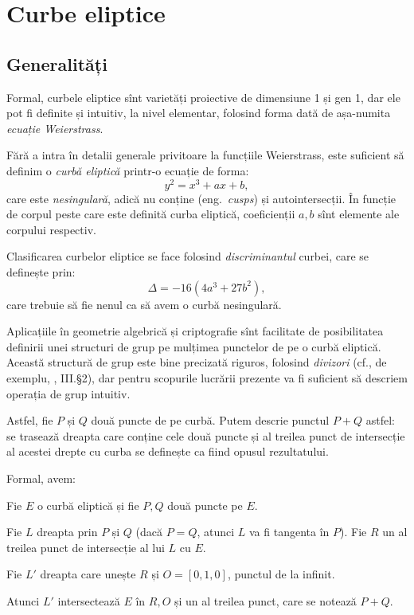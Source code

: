 
\chapter{Curbe eliptice}
\label{ch:curbe}

\section{Generalități}

Formal, curbele eliptice sînt varietăți proiective de dimensiune 1 și gen 1,
dar ele pot fi definite și intuitiv, la nivel elementar, folosind forma
dată de așa-numita \emph{ecuație Weierstrass}.

Fără a intra în detalii generale privitoare la funcțiile Weierstrass, este
suficient să definim o \emph{curbă eliptică} printr-o ecuație de forma:
\[
  y^2 = x^3 + ax + b,
\]
care este \emph{nesingulară}, adică nu conține  (eng.\ \emph{cusps})
și autointersecții. În funcție de corpul peste care este definită curba
eliptică, coeficienții $ a, b $ sînt elemente ale corpului respectiv.

Clasificarea curbelor eliptice se face folosind \emph{discriminantul} curbei,
care se definește prin:
\[
  \Delta = -16(4a^3 + 27b^2),
\]
care trebuie să fie nenul ca să avem o curbă nesingulară.

Aplicațiile în geometrie algebrică și criptografie sînt facilitate de posibilitatea
definirii unei structuri de grup pe mulțimea punctelor de pe o curbă eliptică.
Această structură de grup este bine precizată riguros, folosind \emph{divizori}
(cf., de exemplu, \cite{sil09}, III.\S2), dar pentru scopurile lucrării prezente
va fi suficient să descriem operația de grup intuitiv.

Astfel, fie $ P $ și $ Q $ două puncte de pe curbă. Putem descrie punctul $ P + Q $
astfel: se trasează dreapta care conține cele două puncte și al treilea punct
de intersecție al acestei drepte cu curba se definește ca fiind opusul rezultatului.

Formal, avem:
\begin{definition}\label{def:adunare-pc}
  Fie $ E $ o curbă eliptică și fie $ P, Q $ două puncte pe $ E $.

  Fie $ L $ dreapta prin $ P $ și $ Q $ (dacă $ P = Q $, atunci $ L $ va
  fi tangenta în $ P $). Fie $ R $ un al treilea punct de intersecție al
  lui $ L $ cu $ E $.

  Fie $ L' $ dreapta care unește $ R $ și $ O = [0, 1, 0] $, punctul de la
  infinit.

  Atunci $ L' $ intersectează $ E $ în $ R, O $ și un al treilea punct,
  care se notează $ P + Q $.
\end{definition}

